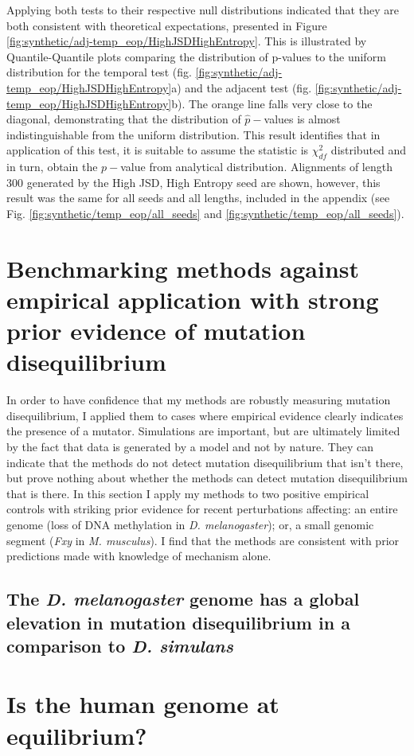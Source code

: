 Applying both tests to their respective null distributions indicated that they are both consistent with theoretical expectations, presented in Figure \ref{fig:synthetic/adj-temp_eop/HighJSDHighEntropy}. This is illustrated by Quantile-Quantile plots comparing the distribution of p-values to the uniform distribution for the temporal test (fig. \ref{fig:synthetic/adj-temp_eop/HighJSDHighEntropy}a) and the adjacent test (fig. \ref{fig:synthetic/adj-temp_eop/HighJSDHighEntropy}b). The orange line falls very close to the diagonal, demonstrating that the distribution of $\hat p-$values is almost indistinguishable from the uniform distribution.  This result identifies that in application of this test, it is suitable to assume the statistic is $\chi^2_{df}$ distributed and in turn, obtain the $p-$value from analytical distribution. Alignments of length 300 generated by the High JSD, High Entropy seed are shown, however, this result was the same for all seeds and all lengths, included in the appendix (see Fig. \ref{fig:synthetic/temp_eop/all_seeds} and \ref{fig:synthetic/temp_eop/all_seeds}).




\section*{Benchmarking methods against empirical application with strong prior evidence of mutation disequilibrium}

 In order to have confidence that my methods are robustly measuring mutation disequilibrium, I applied them to cases where empirical evidence clearly indicates the presence of a mutator. Simulations are important, but are ultimately limited by the fact that data is generated by a model and not by nature. They can indicate that the methods do not detect mutation disequilibrium that isn't there, but prove nothing about whether the methods can detect mutation disequilibrium that is there. In this section I apply my methods to two positive empirical controls with striking prior evidence for recent perturbations affecting: an entire genome (loss of DNA methylation in \textit{D. melanogaster}); or, a small genomic segment (\textit{Fxy} in \textit{M. musculus}). I find that the methods are consistent with prior predictions made with knowledge of mechanism alone. 


\subsection*{The \textit{ D. melanogaster} genome has a global elevation in mutation disequilibrium in a comparison to  \textit{D. simulans}}







\section*{Is the human genome at equilibrium?}